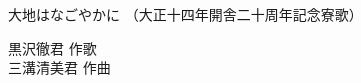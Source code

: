 \documentclass[10pt,b5j]{tarticle} %
\begin{document}
\begin{minipage}[c]{0.7\hsize} %
    \begin{center}
        {\LARGE
            大地はなごやかに %
        }
        {\small 
            （大正十四年開舎二十周年記念寮歌） %
        }
    \end{center}
\end{minipage}
\begin{minipage}[c]{0.3\hsize} %
    \begin{flushright} %
        黒沢徹君 作歌\\三溝清美君 作曲 %
    \end{flushright}
\end{minipage}
\end{document}
